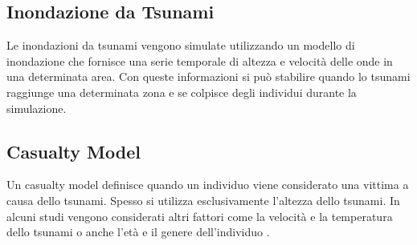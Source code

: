 \subsection{Inondazione da Tsunami}
Le inondazioni da tsunami vengono simulate utilizzando un modello di inondazione
che fornisce una serie temporale di altezza e velocità delle onde in una determinata area.
Con queste informazioni si può stabilire quando lo tsunami raggiunge una determinata zona e 
se colpisce degli individui durante la simulazione.

\subsection{Casualty Model}
Un casualty model definisce quando un individuo viene considerato una vittima a causa dello tsunami.
Spesso si utilizza esclusivamente l'altezza dello tsunami.
In alcuni studi vengono considerati altri fattori come la velocità
e la temperatura dello tsunami o anche l'età e il genere dell'individuo \parencite{yeh2010gender}.
